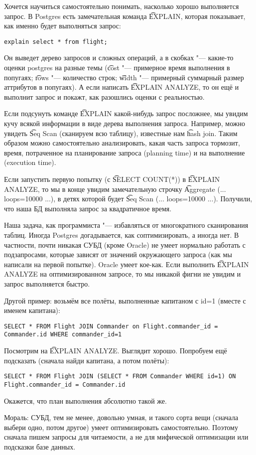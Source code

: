 	Хочется научиться самостоятельно понимать, насколько хорошо выполняется запрос.
	В Postgres есть замечательная команда \t{EXPLAIN}, которая показывает, как именно будет выполняться запрос:
\begin{verbatim}
explain select * from flight;
\end{verbatim}
	Он выведет дерево запросов и сложных операций, а в скобках "--- какие-то оценки postgres на разные темы
	(\t{cost} "--- примерное время выполнения в попугаях; \t{rows} "--- количество строк; \t{width} "--- примерный суммарный размер аттрибутов в попугаях).
	А если написать \t{EXPLAIN ANALYZE}, то он ещё и выполнит запрос и покажт, как разошлись оценки с реальностью.

	Если подсунуть команде \t{EXPLAIN} какой-нибудь запрос посложнее, мы увидим кучу всякой информации
	в виде дерева выполнения запроса.
	Например, можно увидеть \t{Seq Scan} (сканируем всю таблицу), известные нам \t{hash join}.
	Таким образом можно самостоятельно анализировать, какая часть запроса тормозит,
	время, потраченное на планирование запроса (planning time) и на выполнение (execution time).

	Если запустить первую попытку (с \t{SELECT COUNT(*)}) в \t{EXPLAIN ANALYZE}, то
	мы в конце увидим замечательную строчку \t{Aggregate (... loops=10000 ...)}, в детях которой
	будет \t{Seq Scan (... loops=10000 ...)}.
	Получили, что наша БД выполняла запрос за квадратичное время.

	Наша задача, как программиста "--- избавляться от многократного сканирования таблиц.
	Иногда Postgres догадывается, как соптимизировать, а иногда нет.
	В частности, почти никакая СУБД (кроме Oracle) не умеет нормально работать с подзапросами,
	которые зависят от значений окружающего запроса (как мы написали на первой попытке).
	Oracle умеет кое-как.
	Если выполнить \t{EXPLAIN ANALYZE} на оптимизированном запросе, то мы никакой фигни не увидим и
	запрос выполняется быстро.

	Другой пример: возьмём все полёты, выполненные капитаном с id=1 (вместе с именем капитана):
\begin{verbatim}
SELECT * FROM Flight JOIN Commander on Flight.commander_id = Commander.id WHERE commander_id=1
\end{verbatim}
	Посмотрим на \t{EXPLAIN ANALYZE}.
	Выглядит хорошо.
	Попробуем ещё подсказать (сначала найди капитана, а потом полёты):
\begin{verbatim}
SELECT * FROM Flight JOIN (SELECT * FROM Commander WHERE id=1) ON Flight.commander_id = Commander.id
\end{verbatim}
	Окажется, что план выполнения абсолютно такой же.

	Мораль: СУБД, тем не менее, довольно умная, и такого сорта вещи (сначала выбери одно, потом другое)
	умеет оптимизировать самостоятельно.
	Поэтому сначала пишем запросы для читаемости, а не для мифической оптимизации или подсказки базе данных.
